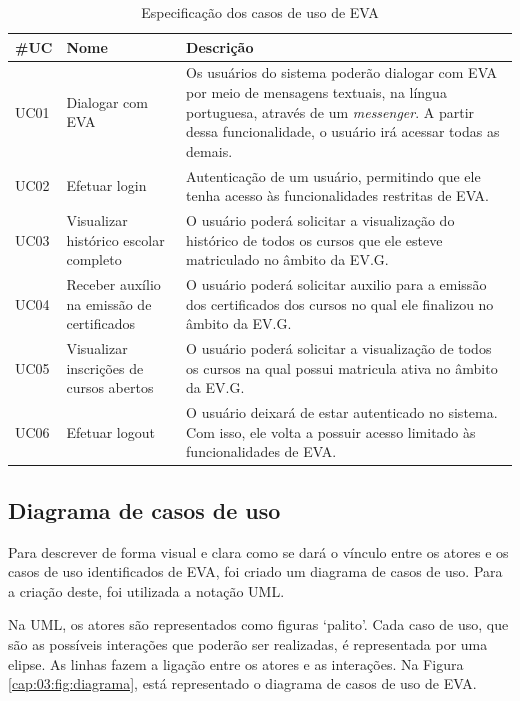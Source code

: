 \begin{table}[htb!]
\caption{Especificação dos casos de uso de EVA}
\label{tabela:tabela4}
\center
\footnotesize
\begin{tabular}{|p{2cm}|p{3cm}|p{7.5cm}|}
  \hline
   \textbf{\#UC} & \textbf{Nome}  & \textbf{Descrição}  \\
   \hline
    UC01 & Dialogar com EVA & Os usuários do sistema poderão dialogar com EVA por meio de mensagens textuais, na língua portuguesa, através de um \textit{messenger}. A partir dessa funcionalidade, o usuário irá acessar todas as demais.\\
   \hline
    UC02 & Efetuar login & Autenticação de um usuário, permitindo que ele tenha acesso às funcionalidades restritas de EVA. \\
   \hline
    UC03 & Visualizar histórico escolar completo & O usuário poderá solicitar a visualização do histórico de todos os cursos que ele esteve matriculado no âmbito da EV.G. \\
   \hline
    UC04 & Receber auxílio na emissão de certificados & O usuário poderá solicitar auxilio para a emissão dos certificados dos cursos no qual ele finalizou no âmbito da EV.G. \\
   \hline
    UC05 & Visualizar inscrições de cursos abertos & O usuário poderá solicitar a visualização de todos os cursos na qual possui matricula ativa no âmbito da EV.G. \\
   \hline
    UC06 & Efetuar logout & O usuário deixará de estar autenticado no sistema. Com isso, ele volta a possuir acesso limitado às funcionalidades de EVA.\\
   \hline
\end{tabular}
\end{table}

\subsection{Diagrama de casos de uso}

Para descrever de forma visual e clara como se dará o vínculo entre os atores e os casos de uso identificados de EVA, foi criado um diagrama de casos de uso. Para a criação deste, foi utilizada a notação UML.

Na UML, os atores são representados como figuras ‘palito’. Cada caso de uso, que são as possíveis interações que poderão ser realizadas, é representada por uma elipse. As linhas fazem a ligação entre os atores e as interações. Na Figura \ref{cap:03:fig:diagrama}, está representado o diagrama de casos de uso de EVA.

